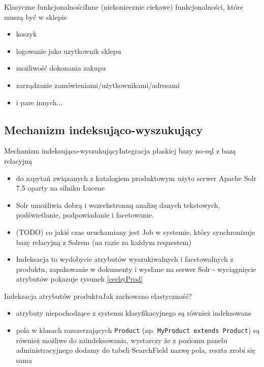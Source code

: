 \documentclass[polish,xcolor=table,9pt,aspectratio=1610,hyperref={pdfpagemode=FullScreen}]{beamer}
\begin{document}
\begin{frame}{Klasyczne funkcjonalności}{Inne (niekoniecznie ciekawe) funkcjonalności, które muszą być w sklepie}
\begin{itemize}
	\item<1-> koszyk
	\item<1-> logowanie jako uzytkownik sklepu 
	\item<1-> możliwość dokonania zakupu
	\item<1-> zarządzanie zamówieniami/użytkownikami/adresami 
	\item<1-> i pare innych... 
\end{itemize}
\end{frame}

\subsection{Mechanizm indeksująco-wyszukujący}

\begin{frame}{Mechanizm indeksująco-wyszukujący}{Integracja płaskiej bazy no-sql z bazą relacyjną}
\begin{itemize}
	\item<1-> do zapytań związanych z katalogiem produktowym użyto serwer Apache Solr 7.5 oparty na silniku Lucene
	\item<1-> Solr umożliwia dobrą i wszechstronną analizę danych tekstowych, podświetlanie, podpowiadanie i facetowanie. 
	\item<1-> (TODO) co jakiś czas uruchamiany jest Job w systemie, który synchronizuje bazę relacyjną z Solrem (na razie za każdym requestem)
	\item<1-> Indeksacja to wydobycie atrybutów wyszukiwalnych i facetowalnych z produktu, zapakowanie w dokumenty i wysłane na serwer Solr - wyciągnięcie atrybutów pokazuje rysunek \ref{cechyProd}
	
\end{itemize}
\end{frame}

\begin{frame}{Indeksacja atrybutów produktu}{Jak zachowano elastyczność?}
\begin{itemize}
	\item<1-> atrybuty niepochodzące z systemu klasyfikacyjnego są również indeksowane
	\item<1-> pola w klasach rozszerzających \texttt{Product} (np. \texttt{MyProduct extends Product}) są również możliwe do zaindeksowania, wystarczy że z poziomu panelu administracyjnego dodamy do tabeli SearchField nazwę pola, reszta zrobi się sama
\end{itemize}
\end{frame}
\end{document}
